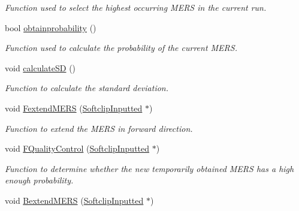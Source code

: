 \begin{DoxyCompactItemize}
\begin{DoxyCompactList}\small\item\em Function used to select the highest occurring M\+E\+R\+S in the current run. \end{DoxyCompactList}\item 
\hypertarget{class_calculation_a55bfeb221b209884e4e3ab43b724af50}{bool \hyperlink{class_calculation_a55bfeb221b209884e4e3ab43b724af50}{obtainprobability} ()}\label{class_calculation_a55bfeb221b209884e4e3ab43b724af50}

\begin{DoxyCompactList}\small\item\em Function used to calculate the probability of the current M\+E\+R\+S. \end{DoxyCompactList}\item 
\hypertarget{class_calculation_a972d493a71867cf09e54cb3e50b91733}{void \hyperlink{class_calculation_a972d493a71867cf09e54cb3e50b91733}{calculate\+S\+D} ()}\label{class_calculation_a972d493a71867cf09e54cb3e50b91733}

\begin{DoxyCompactList}\small\item\em Function to calculate the standard deviation. \end{DoxyCompactList}\item 
\hypertarget{class_calculation_a1e1b01d52bca9881fae807a5541641f8}{void \hyperlink{class_calculation_a1e1b01d52bca9881fae807a5541641f8}{Fextend\+M\+E\+R\+S} (\hyperlink{struct_softclip_inputted}{Softclip\+Inputted} $\ast$)}\label{class_calculation_a1e1b01d52bca9881fae807a5541641f8}

\begin{DoxyCompactList}\small\item\em Function to extend the M\+E\+R\+S in forward direction. \end{DoxyCompactList}\item 
\hypertarget{class_calculation_adb76143c550af00acd021286995a5b1a}{void \hyperlink{class_calculation_adb76143c550af00acd021286995a5b1a}{F\+Quality\+Control} (\hyperlink{struct_softclip_inputted}{Softclip\+Inputted} $\ast$)}\label{class_calculation_adb76143c550af00acd021286995a5b1a}

\begin{DoxyCompactList}\small\item\em Function to determine whether the new temporarily obtained M\+E\+R\+S has a high enough probability. \end{DoxyCompactList}\item 
\hypertarget{class_calculation_aabc390cfd0aaa0fece519d334f0ae3bb}{void \hyperlink{class_calculation_aabc390cfd0aaa0fece519d334f0ae3bb}{Bextend\+M\+E\+R\+S} (\hyperlink{struct_softclip_inputted}{Softclip\+Inputted} $\ast$)}\label{class_calculation_aabc390cfd0aaa0fece519d334f0ae3bb}


\end{DoxyCompactItemize}
